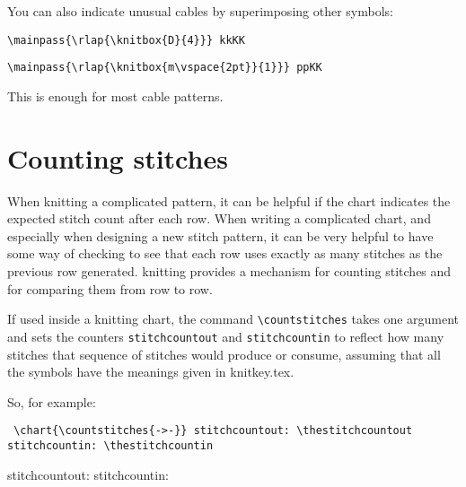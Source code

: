 \documentclass[draft]{amsart}
\begin{document}
\bigskip

You can also indicate unusual cables by superimposing other symbols: \nopagebreak

\bigskip

\noindent\hspace{-10pt}\begin{minipage}[t]{310pt}
\verb?\mainpass{\rlap{\knitbox{D}{4}}} kkKK?\par
\verb?\mainpass{\rlap{\knitbox{m\vspace{2pt}}{1}}} ppKK?
\end{minipage}
\hfill
\begin{minipage}[t]{48pt}
\par
{}
\end{minipage}

\bigskip

This is enough for most cable patterns. 

\section{Counting stitches}
\label{se:counting}

\setcounter{rownumberskip}{1}

When knitting a complicated pattern, it can be helpful if the chart indicates the expected stitch count after each row. When writing a complicated chart, and especially when designing a new stitch pattern, it can be very helpful to have some way of checking to see that each row uses exactly as many stitches as the previous row generated. \textsf{knitting} provides a mechanism for counting stitches and for comparing them from row to row.

If used inside a knitting chart, the command \verb|\countstitches| takes one argument and sets the counters \texttt{stitchcountout} and \texttt{stitchcountin} to reflect how many stitches that sequence of stitches would produce or consume, assuming that all the symbols have the meanings given in \textsf{knitkey.tex}.

So, for example:

\bigskip 

\noindent\begin{minipage}[t]{224pt}
\obeylines\parindent=0pt\tt 
\verb?\chart{\countstitches{->-}}?
\verb?stitchcountout: \thestitchcountout?
\verb?stitchcountin: \thestitchcountin?
\end{minipage}
\quad
\begin{minipage}[t]{108pt} \obeylines
\chart{\countstitches{->-}}
stitchcountout: \thestitchcountout
stitchcountin: \thestitchcountin
\end{minipage}
\end{document}
